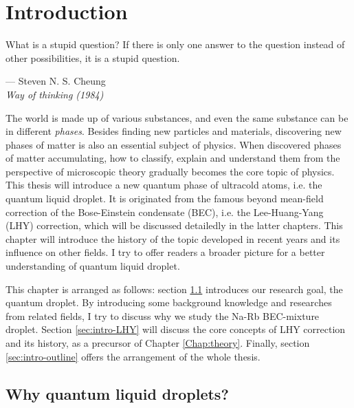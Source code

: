 \chapter{Introduction}
\label{Chap:intro}

\setlength{\unitlength}{1pt}
\setlength{\epigraphwidth}{11cm}
\epigraph{What is a stupid question? If there is only one answer to the question instead of other possibilities, it is a stupid question. \cite{cheung1988}}{--- Steven N. S. Cheung\\ \textit{Way of thinking (1984)}}

The world is made up of various substances, and even the same substance can be in different \textit{phases}. Besides finding new particles and materials, discovering new phases of matter is also an essential subject of physics. When discovered phases of matter accumulating, how to classify, explain and understand them from the perspective of microscopic theory gradually becomes the core topic of physics. This thesis will introduce a new quantum phase of ultracold atoms, i.e. the quantum liquid droplet. It is originated from the famous beyond mean-field correction of the Bose-Einstein condensate (BEC), i.e. the Lee-Huang-Yang (LHY) correction\cite{lee1957}, which will be discussed detailedly in the latter chapters. This chapter will introduce the history of the topic developed in recent years and its influence on other fields. I try to offer readers a broader picture for a better understanding of quantum liquid droplet.

This chapter is arranged as follows: section \ref{sec:intro-background} introduces our research goal, the quantum droplet. By introducing some background knowledge and researches from related fields, I try to discuss why we study the Na-Rb BEC-mixture droplet. Section \ref{sec:intro-LHY} will discuss the core concepts of LHY correction and its history, as a precursor of Chapter \ref{Chap:theory}. Finally, section \ref{sec:intro-outline} offers the arrangement of the whole thesis.

\section{Why quantum liquid droplets?}
\label{sec:intro-background}

